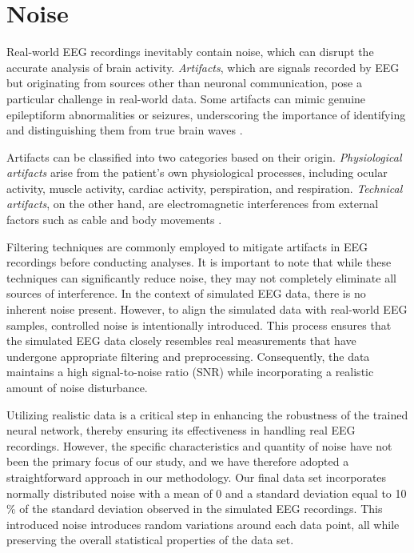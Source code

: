 \documentclass[a4paper, UKenglish, 11pt]{uiomaster}
\begin{document}
\section{Noise} \label{chap:noise}
Real-world EEG recordings inevitably contain noise, which can disrupt the accurate analysis of brain activity. \emph{Artifacts}, which are signals recorded by EEG but originating from sources other than neuronal communication, pose a particular challenge in real-world data. Some artifacts can mimic genuine epileptiform abnormalities or seizures, underscoring the importance of identifying and distinguishing them from true brain waves \cite{sazgar2019eeg}.

Artifacts can be classified into two categories based on their origin. \emph{Physiological artifacts} arise from the patient's own physiological processes, including ocular activity, muscle activity, cardiac activity, perspiration, and respiration. \emph{Technical artifacts}, on the other hand, are electromagnetic interferences from external factors such as cable and body movements \cite{bitbrain}.

Filtering techniques are commonly employed to mitigate artifacts in EEG recordings before conducting analyses. It is important to note that while these techniques can significantly reduce noise, they may not completely eliminate all sources of interference. In the context of simulated EEG data, there is no inherent noise present. However, to align the simulated data with real-world EEG samples, controlled noise is intentionally introduced. This process ensures that the simulated EEG data closely resembles real measurements that have undergone appropriate filtering and preprocessing. Consequently, the data maintains a high signal-to-noise ratio (SNR) while incorporating a realistic amount of noise disturbance.

Utilizing realistic data is a critical step in enhancing the robustness of the trained neural network, thereby ensuring its effectiveness in handling real EEG recordings. However, the specific characteristics and quantity of noise have not been the primary focus of our study, and we have therefore adopted a straightforward approach in our methodology. Our final data set incorporates normally distributed noise with a mean of 0 and a standard deviation equal to 10$\%$ of the standard deviation observed in the simulated EEG recordings. This introduced noise introduces random variations around each data point, all while preserving the overall statistical properties of the data set.
\end{document}
